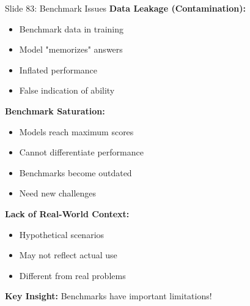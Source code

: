 \documentclass[8pt]{beamer}
\begin{document}
	\begin{frame}{Slide 83: Benchmark Issues}
		\fontsize{6.5}{7.5}\selectfont
		\textbf{Data Leakage (Contamination):}
		\begin{itemize}
			\item Benchmark data in training
			\item Model "memorizes" answers
			\item Inflated performance
			\item False indication of ability
		\end{itemize}
		
		\vspace{0.1cm}
		\textbf{Benchmark Saturation:}
		\begin{itemize}
			\item Models reach maximum scores
			\item Cannot differentiate performance
			\item Benchmarks become outdated
			\item Need new challenges
		\end{itemize}
		
		\vspace{0.1cm}
		\textbf{Lack of Real-World Context:}
		\begin{itemize}
			\item Hypothetical scenarios
			\item May not reflect actual use
			\item Different from real problems
		\end{itemize}
		
		\textcolor{myblue}{\textbf{Key Insight:}} Benchmarks have important limitations!
	\end{frame}
	
\end{document}
